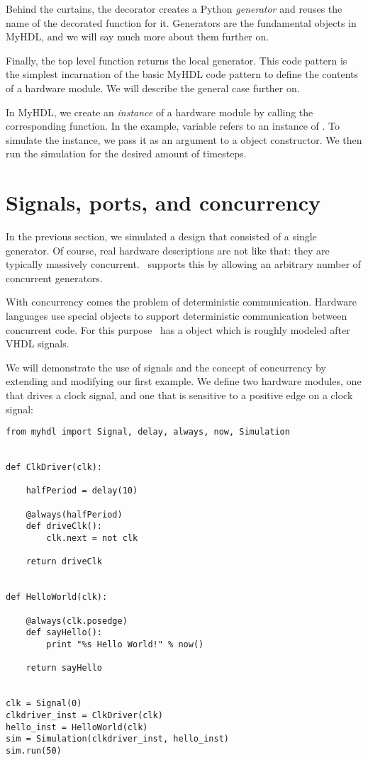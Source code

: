 Behind the curtains, the  decorator creates a Python
\emph{generator} and reuses the name of the decorated function for
it. Generators are the fundamental objects in MyHDL, and we will say
much more about them further on.

Finally, the top level function returns the local generator. This code
pattern is the simplest incarnation of the basic MyHDL code pattern
to define the contents of a hardware module. We will describe the
general case further on.

In MyHDL, we create an \emph{instance} of a hardware module by calling
the corresponding function. In the example, variable  refers
to an instance of .  To simulate the instance, we
pass it as an argument to a  object constructor.  We
then run the simulation for the desired amount of timesteps.

\section{Signals, ports, and concurrency \label{intro-conc}}

In the previous section, we simulated a design that consisted
of a single generator. Of course,
real hardware descriptions are not like that: they are
typically massively concurrent. \myhdl\ supports this by allowing an
arbitrary number of concurrent generators. 

With concurrency comes the problem of deterministic
communication. Hardware languages use special objects to
support deterministic communication between concurrent code.
For this purpose \myhdl\
has a  object which is roughly modeled after VHDL
signals.

We will demonstrate the use of signals and the concept of concurrency
by extending and modifying our first example. We define two hardware
modules, one that drives a clock signal, and one that is sensitive
to a positive edge on a clock signal:


\begin{verbatim}
from myhdl import Signal, delay, always, now, Simulation


def ClkDriver(clk):

    halfPeriod = delay(10)

    @always(halfPeriod)
    def driveClk():
        clk.next = not clk

    return driveClk


def HelloWorld(clk):
    
    @always(clk.posedge)
    def sayHello():
        print "%s Hello World!" % now()

    return sayHello


clk = Signal(0)
clkdriver_inst = ClkDriver(clk)
hello_inst = HelloWorld(clk)
sim = Simulation(clkdriver_inst, hello_inst)
sim.run(50)
\end{verbatim}

